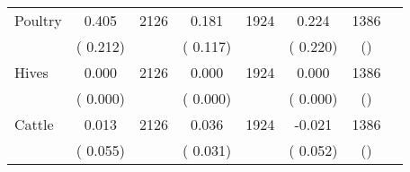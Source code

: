 \begin{tabular}{l*{6}{c}}
Poultry        &              0.405      &       2126       &              0.181      &       1924       &              0.224      &       1386  &  &              \\
                       &       (       0.212)            &                               &       (       0.117)            &                               &       (       0.220)            &       () &                  \\
Hives        &              0.000      &       2126       &              0.000      &       1924       &              0.000      &       1386  &  &              \\
                       &       (       0.000)            &                               &       (       0.000)            &                               &       (       0.000)            &       () &                  \\
Cattle        &              0.013      &       2126       &              0.036      &       1924       &             -0.021      &       1386  &  &              \\
                       &       (       0.055)            &                               &       (       0.031)            &                               &       (       0.052)            &       () &                  \\
\hline \end{tabular}